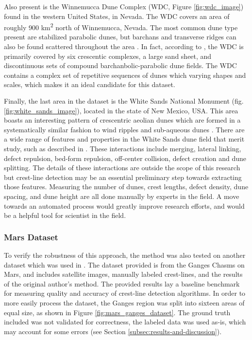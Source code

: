 Also present is the Winnemucca Dune Complex (WDC, Figure \ref{fig:wdc_image}) found in the western United States, in Nevada. The WDC covers an area of roughly 900 km\textsuperscript{2} north of Winnemucca, Nevada. The most common dune type present are stabilized parabolic dunes, but barchans and transverse ridges can also be found scattered throughout the area \cite{zimbelman_eolian_deposits_western_united_states}. In fact, according to \cite{pepe_winnemucca_dune_complex}, the WDC is primarily covered by six crescentic complexes, a large sand sheet, and discontinuous sets of compound barchanbolic-parabolic dune fields. The WDC contains a complex set of repetitive sequences of dunes which varying shapes and scales, which makes it an ideal candidate for this dataset.

Finally, the last area in the dataset is the White Sands National Monument (fig. \ref{fig:white_sands_image}), located in the state of New Mexico, USA. This area boasts an interesting pattern of crescentric aeolian dunes which are formed in a systematically similar fashion to wind ripples and sub-aqueous dunes \cite{ewing_aeolian_dune_interaction_white_sands}. There are a wide range of features and properties in the White Sands dune field that merit study, such as described in \cite{ewing_aeolian_dune_interaction_white_sands}. These interactions include merging, lateral linking, defect repulsion, bed-form repulsion, off-center collision, defect creation and dune splitting. The details of these interactions are outside the scope of this research but crest-line detection may be an essential preliminary step towards extracting those features. Measuring the number of dunes, crest lengths, defect density, dune spacing, and dune height are all done manually by experts in the field. A move towards an automated process would greatly improve research efforts, and would be a helpful tool for scientist in the field.

\subsubsection{Mars Dataset}
\label{subsec:mars_dataset}
To verify the robustness of this approach, the method was also tested on another dataset which was used in \cite{vaz_object_based_dune_analysis}. The dataset provided is from the Ganges Chasms on Mars, and includes satellite images, manually labeled crest-lines, and the results of the original author's method. The provided results lay a baseline benchmark for measuring quality and accuracy of crest-line detection algorithms. In order to more easily process the dataset, the Ganges region was split into sixteen areas of equal size, as shown in Figure \ref{fig:mars_ganges_dataset}. The ground truth included was not validated for correctness, the labeled data was used as-is, which may account for some errors (see Section \ref{subsec:results-and-discussion}).

